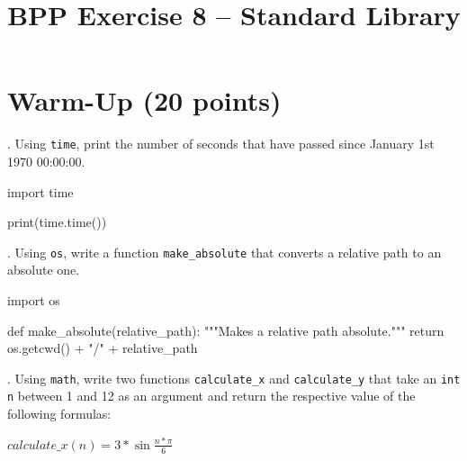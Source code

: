 


\title{BPP Exercise 8 -- Standard Library}




\section{Warm-Up (20 points)}

. Using \texttt{time}, print the number of seconds that have passed since January 1st 1970 00:00:00.

\vspace{1em}

\begin{solution}

\begin{pythoncode}

import time

print(time.time())

\end{pythoncode}

\end{solution}

. Using \texttt{os}, write a function \texttt{make\_absolute} that converts a relative path to an absolute one.

\vspace{1em}

\begin{solution}

\begin{pythoncode}

import os

def make_absolute(relative_path):
    """Makes a relative path absolute."""
    return os.getcwd() + "/" + relative_path

\end{pythoncode}

\end{solution}

. Using \texttt{math}, write two functions \texttt{calculate\_x} and \texttt{calculate\_y} that take an \texttt{int n} between 1 and 12 as an argument and return the respective value of the following formulas:

\vspace{1em}

\noindent $calculate\_x(n) = 3 * \sin{\frac{n * \pi}{6}}$

\vspace{1em}

